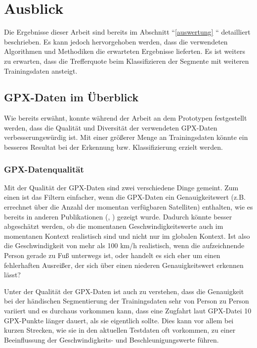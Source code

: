 \chapter{Ausblick}
Die Ergebnisse dieser Arbeit sind bereits im Abschnitt ``\ref{auswertung} `` detailliert beschrieben. Es kann jedoch hervorgehoben werden, dass die verwendeten Algorithmen und Methodiken die erwarteten Ergebnisse lieferten. Es ist weiters zu erwarten, dass die Trefferquote beim Klassifizieren der Segmente mit weiteren Trainingsdaten ansteigt.

\section{GPX-Daten im Überblick}
Wie bereits erwähnt, konnte während der Arbeit an dem Prototypen festgestellt werden, dass die Qualität und Diversität der verwendeten GPX-Daten verbesserungswürdig ist. Mit einer größerer Menge an Trainingsdaten könnte ein besseres Resultat bei der Erkennung bzw. Klassifizierung erzielt werden. 

\subsection{GPX-Datenqualität}
Mit der Qualität der GPX-Daten sind zwei verschiedene Dinge gemeint. Zum einen ist das Filtern einfacher, wenn die GPX-Daten ein Genauigkeitswert (z.B. errechnet über die Anzahl der momentan verfügbaren Satelliten) enthalten, wie es bereits in anderen Publikationen  (\cite{stenneth_transportation_2011}, \cite{nadine_schussler_improving_2011}) gezeigt wurde. Dadurch könnte besser abgeschätzt werden, ob die momentanen Geschwindigkeitswerte auch im momentanen Kontext realistisch sind und nicht nur im globalen Kontext. Ist also die Geschwindigkeit von mehr als 100 km/h realistisch, wenn die aufzeichnende Person gerade zu Fuß unterwegs ist, oder handelt es sich eher um einen fehlerhaften Ausreißer, der sich über einen niederen Genauigkeitswert erkennen lässt?

Unter der Qualität der GPX-Daten ist auch zu verstehen, dass die Genauigkeit bei der händischen Segmentierung der Trainingsdaten sehr von Person zu Person variiert und es durchaus vorkommen kann, dass eine Zugfahrt laut GPX-Datei 10 GPX-Punkte länger dauert, als sie eigentlich sollte. Dies kann vor allem bei kurzen Strecken, wie sie in den aktuellen Testdaten oft vorkommen, zu einer Beeinflussung der Geschwindigkeits- und Beschleunigungswerte führen.


